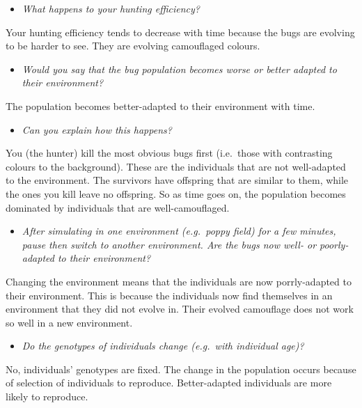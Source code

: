 \documentclass[
  a4paper]{book}
\providecommand{\tightlist}{%
  \setlength{\itemsep}{0pt}\setlength{\parskip}{0pt}}
\begin{document}
\begin{itemize}
\tightlist
\item
  \emph{What happens to your hunting efficiency?}
\end{itemize}

Your hunting efficiency tends to decrease with time because the bugs are
evolving to be harder to see. They are evolving camouflaged colours.

\begin{itemize}
\tightlist
\item
  \emph{Would you say that the bug population becomes worse or better
  adapted to their environment?}
\end{itemize}

The population becomes better-adapted to their environment with time.

\begin{itemize}
\tightlist
\item
  \emph{Can you explain how this happens?}
\end{itemize}

You (the hunter) kill the most obvious bugs first (i.e.~those with
contrasting colours to the background). These are the individuals that
are not well-adapted to the environment. The survivors have offspring
that are similar to them, while the ones you kill leave no offspring. So
as time goes on, the population becomes dominated by individuals that
are well-camouflaged.

\begin{itemize}
\tightlist
\item
  \emph{After simulating in one environment (e.g.~poppy field) for a few
  minutes, pause then switch to another environment. Are the bugs now
  well- or poorly-adapted to their environment?}
\end{itemize}

Changing the environment means that the individuals are now
porrly-adapted to their environment. This is because the individuals now
find themselves in an environment that they did not evolve in. Their
evolved camouflage does not work so well in a new environment.

\begin{itemize}
\tightlist
\item
  \emph{Do the genotypes of individuals change (e.g.~with individual
  age)?}
\end{itemize}

No, individuals' genotypes are fixed. The change in the population
occurs because of selection of individuals to reproduce. Better-adapted
individuals are more likely to reproduce.
\end{document}
